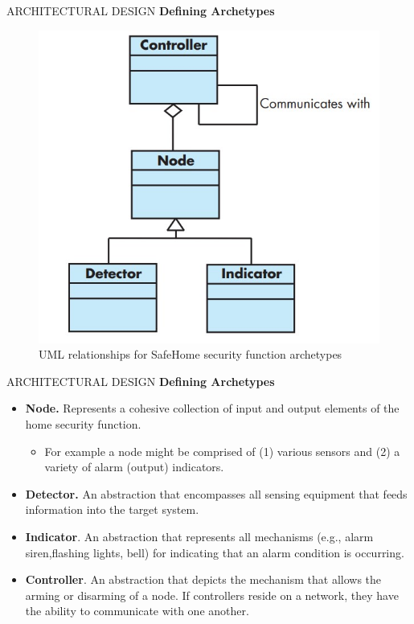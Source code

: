 \documentclass{beamer}
\begin{document}
\begin{frame}{ARCHITECTURAL DESIGN}
\textbf{ Defining Archetypes}
	
	\begin{figure}
		\includegraphics[scale=.45]{img/m2_42.jpg}
		\caption{UML relationships for 
			SafeHome
			security 
			function 
			archetypes }
	\end{figure}
	
	
\end{frame}
\begin{frame}{ARCHITECTURAL DESIGN}
	\textbf{ Defining Archetypes}
	\begin{itemize}
		\item \textbf{Node.} Represents a cohesive collection of input and output 	elements of the home security function. 
	\begin{itemize}
		\item For example a node might be comprised of (1) various sensors and (2) a variety of alarm (output) indicators.

	\end{itemize}
		\item \textbf{Detector. }An abstraction that encompasses all sensing 
		equipment that feeds information into the target system.
		\item \textbf{Indicator}. An abstraction that represents all mechanisms 
		(e.g., alarm siren,flashing lights, bell) for indicating that 
		an alarm condition is occurring.
	\item  \textbf{Controller}. An abstraction that depicts the mechanism 
		that allows the arming or disarming of a node. If controllers reside on a network, they have the ability to communicate with one another.
	\end{itemize}
	
	
\end{frame}
\end{document}
